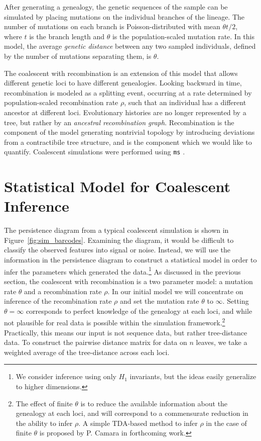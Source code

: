 After generating a genealogy, the genetic sequences of the sample can be simulated by placing mutations on the individual branches of the lineage.
The number of mutations on each branch is Poisson-distributed with mean $\theta t / 2$, where $t$ is the branch length and $\theta$ is the population-scaled mutation rate.
In this model, the average \emph{genetic distance} between any two sampled individuals, defined by the number of mutations separating them, is $\theta$.

The coalescent with recombination is an extension of this model that allows different genetic loci to have different genealogies.
Looking backward in time, recombination is modeled as a splitting event, occurring at a rate determined by population-scaled recombination rate $\rho$, such that an individual has a different ancestor at different loci.
Evolutionary histories are no longer represented by a tree, but rather by an \emph{ancestral recombination graph}.
Recombination is the component of the model generating nontrivial topology by introducing deviations from a contractibile tree structure, and is the component which we would like to quantify.
Coalescent simulations were performed using \texttt{ms} \cite{Hudson:2002}.

\section{Statistical Model for Coalescent Inference}
\label{sec:model}

The persistence diagram from a typical coalescent simulation is shown in Figure~\ref{fig:sim_barcodes}.
Examining the diagram, it would be difficult to classify the observed features into signal or noise.
Instead, we will use the information in the persistence diagram to construct a statistical model in order to infer the parameters which generated the data.\footnote{We consider inference using only $H_1$ invariants, but the ideas easily generalize to higher dimensions.}
As discussed in the previous section, the coalescent with recombination is a two parameter model: a mutation rate $\theta$ and a recombination rate $\rho$.
In our initial model we will concentrate on inference of the recombination rate $\rho$ and set the mutation rate $\theta$ to $\infty$.
Setting $\theta=\infty$ corresponds to perfect knowledge of the genealogy at each loci, and while not plausible for real data is possible within the simulation framework.\footnote{The effect of finite $\theta$ is to reduce the available information about the genealogy at each loci, and will correspond to a commensurate reduction in the ability to infer $\rho$. A simple TDA-based method to infer $\rho$ in the case of finite $\theta$ is proposed by P. Camara in forthcoming work.}
Practically, this means our input is not sequence data, but rather tree-distance data.
To construct the pairwise distance matrix for data on $n$ leaves, we take a weighted average of the tree-distance across each loci.

